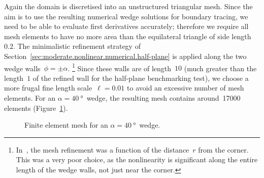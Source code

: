 Again the domain is discretised into an unstructured triangular mesh.
Since the aim is to use the resulting numerical wedge solutions
for boundary tracing,
we need to be able to evaluate first derivatives accurately;
therefore we require all mesh elements to have no more area than
the equilateral triangle of side length~$0.2$.
The minimalistic refinement strategy
of Section~\ref{sec:moderate.nonlinear.numerical.half-plane}
is applied along the two wedge walls~$\phi = \pm \alpha$.%
\footnote{
  In~\cite{li-2017-thesis-rounding-capillary-wedge},
  the mesh refinement was a function of the distance~$r$ from the corner.
  This was a very poor choice,
  as the nonlinearity is significant
  along the entire length of the wedge walls,
  not just near the corner.
}
Since these walls are of length~$10$
(much greater than the length~$1$
of the refined wall for the half-plane benchmarking test),
we choose a more frugal fine length scale~$\ell = 0.01$
to avoid an excessive number of mesh elements.
For an $\alpha = \SI{40}{\degree}$~wedge,
the resulting mesh contains around~17000 elements
(Figure~\ref{fig:wedge_acute-mesh}).

\begin{figure}
  \centering
  \begin{subfigure}[t]{0.67\textwidth}
  \end{subfigure}
    \hfill
  \begin{subfigure}[t]{0.27\textwidth}
  \end{subfigure}
  \caption{
    Finite element mesh for an $\alpha = \SI{40}{\degree}$~wedge.
  }
  \label{fig:wedge_acute-mesh}
\end{figure}

